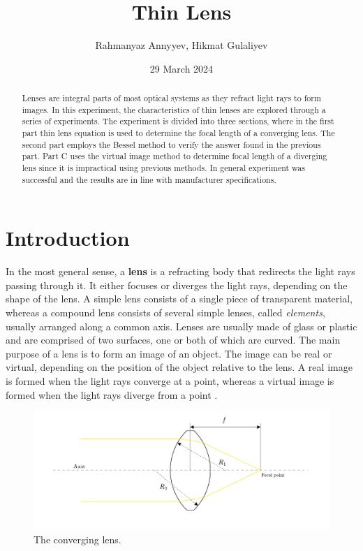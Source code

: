 \documentclass[10pt]{article}
\title{Thin Lens}
\author{Rahmanyaz Annyyev, Hikmat Gulaliyev}
\date{29 March 2024}
\begin{document}
\maketitle

\begin{abstract}
Lenses are integral parts of most optical systems as they refract light rays to form images. In this experiment, the characteristics of thin lenses are explored through a series of experiments. The experiment is divided into three sections, where in the first part thin lens equation is used to determine the focal length of a converging lens.
The second part employs the Bessel method to verify the answer found in the previous part. Part C uses the virtual image method to determine focal length of a diverging lens since it is impractical using previous methods. In general experiment was successful and the results are in line with manufacturer specifications. 
\end{abstract}

\section{Introduction}


In the most general sense, a \textbf{lens} is a refracting body that redirects the light rays passing through it. It either focuses or diverges the light rays, depending on the shape of the lens. A simple lens consists of a single piece of transparent material, whereas a compound lens consists of several simple lenses, called \textit{elements}, usually arranged along a common axis. Lenses are usually made of glass or plastic and are comprised of two surfaces, one or both of which are curved. The main purpose of a lens is to form an image of an object. The image can be real or virtual, depending on the position of the object relative to the lens. A real image is formed when the light rays converge at a point, whereas a virtual image is formed when the light rays diverge from a point \cite{Giancoli_2014}. 

\begin{figure}[hbt!]
  \centering
  \includegraphics[scale=0.5]{figures/f1.pdf}
  \caption{The converging lens.}
  \label{fig:1}
\end{figure}
\end{document}
